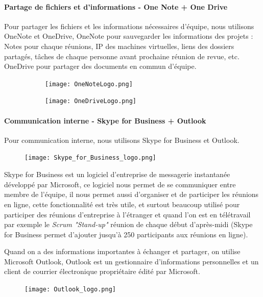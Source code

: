     
    \paragraph{Partage de fichiers et d'informations - One Note + One Drive }
    Pour partager les fichiers et les informations nécessaires d'équipe, nous utilisons OneNote et OneDrive, OneNote pour sauvegarder les informations des projets : Notes pour chaque réunions, IP des machines virtuelles, liens des dossiers partagés, tâches de chaque personne avant prochaine réunion de revue, etc. OneDrive pour partager des documents en commun d'équipe.
    
    \begin{figure}[H]
    	\flushleft
    	\begin{subfigure}[b]{.2\textwidth}
    		\texttt{[image: OneNoteLogo.png]}
    	\end{subfigure}
    	\begin{subfigure}[b]{.2\textwidth}
    		\texttt{[image: OneDriveLogo.png]}
    	\end{subfigure}
    	\label{fig:oneNote_oneDrive_label}
    \end{figure}
    
    \paragraph{Communication interne - Skype for Business + Outlook}
    Pour communication interne, nous utilisons Skype for Business et Outlook.
    
    \begin{figure}[H]
    	\flushleft
    	\texttt{[image: Skype\_for\_Business\_logo.png]}
    	\label{skype_lable}
    \end{figure}
    
    \par Skype for Business est un logiciel d'entreprise de messagerie instantanée développé par Microsoft, ce logiciel nous permet de se communiquer entre membre de l'équipe, il nous permet aussi d'organiser et de participer les réunions en ligne, cette fonctionnalité est très utile, et surtout beaucoup utilisé pour participer des réunions d'entreprise à l'étranger et quand l'on est en télétravail par exemple le \textit{Scrum "Stand-up"} réunion de chaque début d'après-midi (Skype for Business permet d'ajouter jusqu'à 250 participants aux réunions en ligne).
    
    
    \par Quand on a des informations importantes à échanger et partager, on utilise Microsoft Outlook, Outlook est un gestionnaire d'informations personnelles et un client de courrier électronique propriétaire édité par Microsoft. 
    \begin{figure}[H]
    	\flushleft
    	\texttt{[image: Outlook\_logo.png]}
    	\label{fig:outlook_label}
    \end{figure}
    
